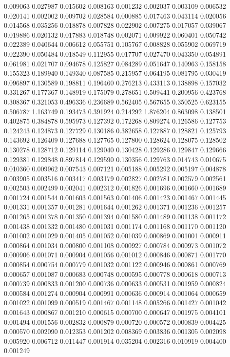 0.009063
0.027987
0.015602
0.008163
0.001232
0.002037
0.003109
0.006532
0.020141
0.002002
0.009702
0.028584
0.000885
0.017463
0.043114
0.020056
0.014568
0.035256
0.018878
0.007828
0.022902
0.007275
0.017057
0.039067
0.019886
0.020132
0.017883
0.018748
0.002071
0.009922
0.060401
0.050742
0.022389
0.040644
0.006612
0.055751
0.105767
0.008828
0.055902
0.069719
0.022390
0.050484
0.018549
0.112955
0.017707
0.027470
0.043350
0.054891
0.061981
0.021707
0.094678
0.125827
0.084289
0.051647
0.140963
0.158158
0.155323
0.189940
0.149340
0.087585
0.215957
0.064195
0.081795
0.030419
0.096897
0.130589
0.198811
0.196460
0.276213
0.433113
0.138898
0.157032
0.331267
0.177367
0.148919
0.175079
0.278651
0.509441
0.200956
0.423768
0.308367
0.321053
0.496336
0.236689
0.562405
0.567655
0.350525
0.623155
0.506787
1.163749
0.193473
0.391924
0.214292
1.876204
0.863098
0.138501
0.402875
0.384878
0.595973
0.127392
0.172268
0.809274
0.126586
0.127753
0.124243
0.124873
0.127729
0.130186
0.382658
0.127887
0.128821
0.125793
0.143692
0.126409
0.127688
0.127765
0.127800
0.128624
0.128075
0.128502
0.130278
0.128712
0.129114
0.129040
0.130428
0.129286
0.129847
0.129666
0.129381
0.129848
0.897814
0.129590
0.130356
0.129763
0.014743
0.010675
0.010360
0.009962
0.007543
0.007121
0.005188
0.005292
0.005197
0.004878
0.003905
0.003516
0.003417
0.003179
0.002827
0.002781
0.002579
0.002561
0.002503
0.002499
0.002041
0.002312
0.001826
0.001696
0.001660
0.001689
0.001724
0.001544
0.001603
0.001563
0.001406
0.001423
0.001467
0.001445
0.001331
0.001357
0.001281
0.001644
0.001262
0.001371
0.001236
0.001257
0.001265
0.001378
0.001350
0.001394
0.001580
0.001489
0.001138
0.001172
0.001438
0.001332
0.001480
0.001031
0.001174
0.001168
0.001170
0.001120
0.001002
0.001029
0.001405
0.001052
0.001039
0.000869
0.001001
0.000911
0.000864
0.001034
0.000800
0.001108
0.000927
0.000784
0.000973
0.001072
0.000906
0.001071
0.000904
0.001056
0.001012
0.000846
0.000871
0.001770
0.000854
0.000754
0.000779
0.001032
0.001122
0.000946
0.000861
0.000769
0.000657
0.001087
0.000683
0.000748
0.000595
0.000778
0.000618
0.000713
0.000739
0.000833
0.001200
0.000736
0.000633
0.000531
0.001959
0.000824
0.000584
0.001274
0.000904
0.000991
0.000636
0.000914
0.001064
0.000659
0.001022
0.001099
0.000519
0.001467
0.001148
0.005266
0.001427
0.001042
0.001643
0.000867
0.001210
0.000615
0.000700
0.000647
0.001975
0.004101
0.001494
0.001556
0.002832
0.000879
0.000720
0.000572
0.000839
0.004425
0.000570
0.002090
0.012353
0.001202
0.008369
0.003836
0.001305
0.002098
0.005920
0.006712
0.011447
0.001914
0.035204
0.002316
0.010919
0.004400
0.001249
